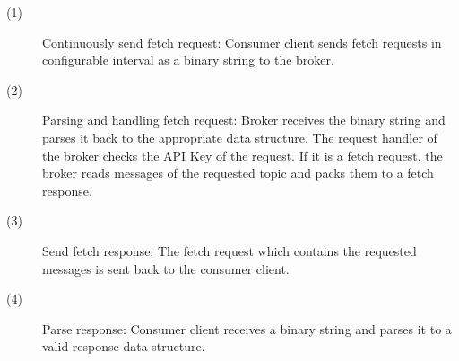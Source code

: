\begin{description}
    \item [(1)] 
        {Continuously send fetch request: Consumer client sends fetch
        requests in configurable interval as a binary string to the broker. } 
    \item [(2)] 
        {Parsing and handling fetch request: Broker receives the binary string
            and parses it back to the appropriate data structure. The request
            handler of the broker checks the API Key of the request. If it is a
            fetch request, the broker reads messages of the requested topic and
            packs them to a fetch response.}
    \item [(3)] 
        {Send fetch response: The fetch request which contains the requested
        messages is sent back to the consumer client.}
    \item [(4)] 
        {Parse response: Consumer client receives a binary string and parses it
        to a valid response data structure. }
\end{description}

